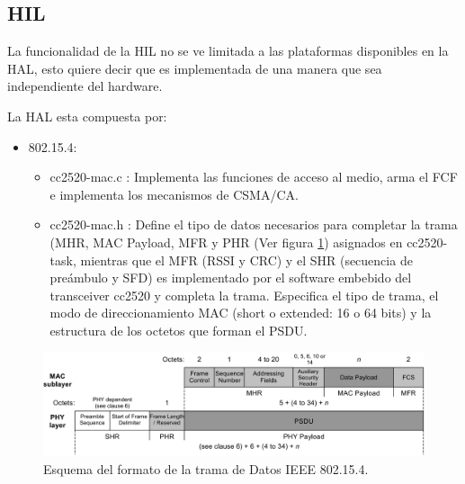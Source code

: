 {%
\subsection{HIL}
\label{subsec:hil}
La funcionalidad de la HIL no se ve limitada a las plataformas disponibles en la HAL, esto quiere decir que es implementada de una manera que sea independiente del hardware.

\noindent La HAL esta compuesta por:
\begin{itemize}
\item 802.15.4:
	\begin{itemize}
	\item cc2520-mac.c : Implementa las funciones de acceso al medio, arma el FCF e implementa los mecanismos de CSMA/CA.
	\item cc2520-mac.h : Define el tipo de datos necesarios para completar la trama (MHR, MAC Payload, MFR y PHR (Ver figura \ref{fig:data}) asignados en cc2520-task, mientras que el MFR (RSSI y CRC) y el SHR (secuencia de preámbulo y SFD) es implementado por el software embebido del transceiver cc2520 y completa la trama. Especifica el tipo de trama, el modo de direccionamiento MAC (short o extended: 16 o 64 bits) y la estructura de los octetos que forman el PSDU.
	\end{itemize}
\end{itemize}

\vspace{20px}
\begin{figure}[h!]
	\centering
    \includegraphics[width=1\textwidth]{./Figures/data.jpg}
    	\caption{Esquema del formato de la trama de Datos IEEE 802.15.4.}
	\label{fig:data}
\end{figure}

}
